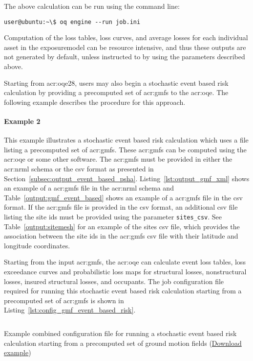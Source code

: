 The above calculation can be run using the command line:

\begin{verbatim}
user@ubuntu:~\$ oq engine --run job.ini
\end{verbatim}

Computation of the loss tables, loss curves, and average losses for each
individual \gls{asset} in the \gls{exposuremodel} can be resource intensive,
and thus these outputs are not generated by default, unless instructed to by
using the parameters described above.


Starting from \gls{acr:oqe28}, users may also begin a stochastic event based
risk calculation by providing a precomputed set of \glspl{acr:gmf} to the
\gls{acr:oqe}. The following example describes the procedure for this
approach.

\paragraph{Example 2}

This example illustrates a stochastic event based risk calculation which uses
a file listing a precomputed set of \glspl{acr:gmf}. These \glspl{acr:gmf} can
be computed using the \glsdesc{acr:oqe} or some other software. The
\glspl{acr:gmf} must be provided in either the \gls{acr:nrml} schema or the
csv format as presented in Section~\ref{subsec:output_event_based_psha}.
Listing~\ref{lst:output_gmf_xml} shows an example of a \glspl{acr:gmf} file in
the \gls{acr:nrml} schema and Table~\ref{output:gmf_event_based} shows an
example of a \glspl{acr:gmf} file in the csv format. If the \glspl{acr:gmf}
file is provided in the csv format, an additional csv file listing the site
ids must be provided using the parameter \Verb+sites_csv+. See
Table~\ref{output:sitemesh} for an example of the sites csv file, which
provides the association between the site ids in the \glspl{acr:gmf} csv file
with their latitude and longitude coordinates.

Starting from the input \glspl{acr:gmf}, the \gls{acr:oqe} can calculate event
loss tables, loss exceedance curves and probabilistic loss maps for structural
losses, nonstructural losses, insured structural losses, and occupants. The
job configuration file required for running this stochastic event based risk
calculation starting from a precomputed set of \glspl{acr:gmf} is shown in
Listing~\ref{lst:config_gmf_event_based_risk}.

\begin{listing}[htbp]
  \inputminted[firstline=1,firstnumber=1,fontsize=\scriptsize
  ,frame=single,bgcolor=lightgray,linenos,label=job.ini]{ini}{oqum/risk/verbatim/config_gmf_event_based_risk.ini}
  \caption{Example combined configuration file for running a stochastic event based risk calculation starting from a precomputed set of ground motion fields (\href{https://raw.githubusercontent.com/gem/oq-engine/master/doc/manual/oqum/risk/verbatim/config_gmf_event_based_risk.ini}{Download example})}
  \label{lst:config_gmf_event_based_risk}
\end{listing}